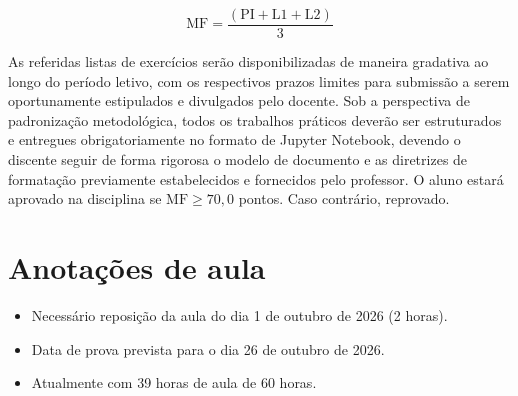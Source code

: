 $$\text{MF} = \frac{(\text{PI} + \text{L1} + \text{L2})}{3}$$

As referidas listas de exercícios serão disponibilizadas de maneira gradativa ao longo do período letivo, com os respectivos prazos limites para submissão a serem oportunamente estipulados e divulgados pelo docente. Sob a perspectiva de padronização metodológica, todos os trabalhos práticos deverão ser estruturados e entregues obrigatoriamente no formato de Jupyter Notebook, devendo o discente seguir de forma rigorosa o modelo de documento e as diretrizes de formatação previamente estabelecidos e fornecidos pelo professor. O aluno estará aprovado na disciplina se $\text{MF}\geq 70,0$ pontos. Caso contrário, reprovado.


\section*{Anotações de aula}

\begin{itemize}
    \item Necessário reposição da aula do dia 1 de outubro de 2026 (2 horas).
    \item Data de prova prevista para o dia 26 de outubro de 2026.
    \item Atualmente com 39 horas de aula de 60 horas.
\end{itemize}
